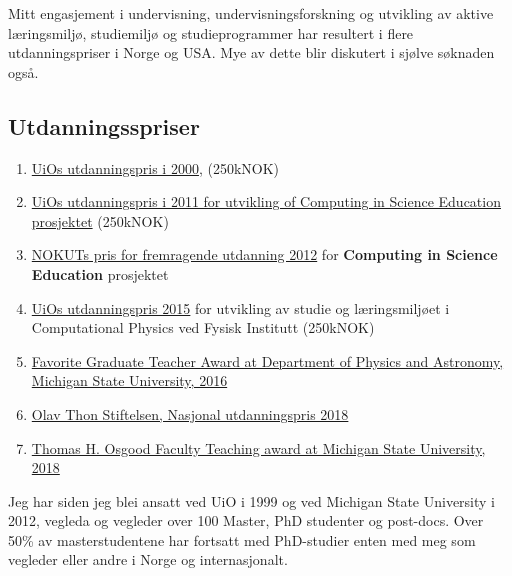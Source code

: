 \documentclass[aps,floatfix,preprint]{revtex4-1}
\begin{document}
Mitt engasjement i undervisning, undervisningsforskning og utvikling
av aktive læringsmiljø, studiemiljø og studieprogrammer har resultert
i flere utdanningspriser i Norge og USA. Mye av dette blir diskutert i sjølve søknaden også.

\subsection*{Utdanningsspriser}
\begin{enumerate}
\item \href{{http://www.uniforum.uio.no/nyheter/2000/11/det-viktigste-er-aa-inspirere.html}}{UiOs utdanningspris i 2000},  (250kNOK)

\item \href{{http://www.uniforum.uio.no/nyheter/2011/08/undervisning-for-framtidig-forsking.html}}{UiOs utdanningspris i 2011 for utvikling of Computing in Science Education prosjektet}  (250kNOK)

\item \href{{http://www.uniforum.uio.no/nyheter/2012/04/uio-tok-andreplass-i-utdanningskvalitet.html}}{NOKUTs pris for fremragende utdanning 2012} for  \textbf{Computing in Science Education} prosjektet

\item \href{{http://www.uniforum.uio.no/nyheter/2015/10/instituttet-som-lofter-fram-gode-forelesere.html}}{UiOs utdanningspris 2015} for utvikling av studie og læringsmiljøet i Computational Physics ved Fysisk Institutt (250kNOK)

\item \href{{https://pa.msu.edu/news-events/news/2016-departmental-awards/}}{Favorite Graduate Teacher Award at Department of Physics  and Astronomy, Michigan State University, 2016} 

\item \href{{https://www.ntbinfo.no/pressemelding/olav-thon-stiftelsen-annonserte-arets-priser-42-millioner-til-forskning-og-undervisning?publisherId=8983491&releaseId=16475069}}{Olav Thon Stiftelsen, Nasjonal utdanningspris 2018}

\item \href{{https://web.pa.msu.edu/alumni/awards/osgood_fac_awards.html}}{Thomas H. Osgood Faculty Teaching award at Michigan State University, 2018}
\end{enumerate}

\noindent
Jeg har siden jeg blei ansatt ved UiO i 1999 og ved Michigan State
University i 2012, vegleda og vegleder over 100 Master, PhD studenter og post-docs. Over 50\%
av masterstudentene har fortsatt med PhD-studier enten med meg som
vegleder eller andre i Norge og internasjonalt.
\end{document}
